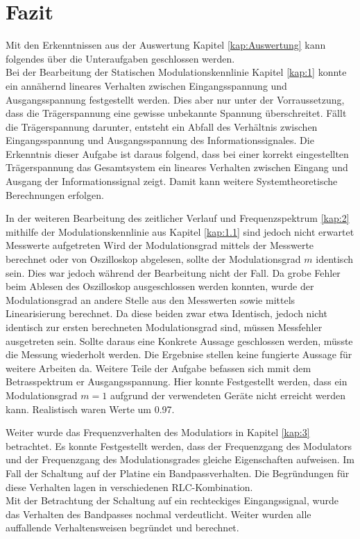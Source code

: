\documentclass[12pt]{scrartcl}
\begin{document}
\section{Fazit}
Mit den Erkenntnissen aus der Auswertung Kapitel \ref{kap:Auswertung} kann folgendes über die Unteraufgaben geschlossen werden.\\
Bei der Bearbeitung der Statischen Modulationskennlinie Kapitel \ref{kap:1} konnte ein annähernd lineares Verhalten zwischen Eingangsspannung und Ausgangsspannung festgestellt werden. 
Dies aber nur unter der Vorraussetzung, dass die Trägerspannung eine gewisse unbekannte Spannung überschreitet.
Fällt die Trägerspannung darunter, entsteht ein Abfall des Verhältnis zwischen Eingangsspannung und Ausgangsspannung des Informationssignales.
Die Erkenntnis dieser Aufgabe ist daraus folgend, dass bei einer korrekt eingestellten Trägerspannung das Gesamtsystem ein lineares Verhalten zwischen Eingang und Ausgang der Informationssignal zeigt. 
Damit kann weitere Systemtheoretische Berechnungen erfolgen.
\bigskip

In der weiteren Bearbeitung des zeitlicher Verlauf und Frequenzspektrum \ref{kap:2} mithilfe der Modulationskennlinie aus Kapitel \ref{kap:1.1} sind jedoch nicht erwartet Messwerte aufgetreten
Wird der Modulationsgrad mittels der Messwerte berechnet oder von Oszilloskop abgelesen, sollte der Modulationsgrad $m$ identisch sein. 
Dies war jedoch während der Bearbeitung nicht der Fall. 
Da grobe Fehler beim Ablesen des Oszilloskop ausgeschlossen werden konnten, wurde der Modulationsgrad an andere Stelle aus den Messwerten sowie mittels Linearisierung berechnet. 
Da diese beiden zwar etwa Identisch, jedoch nicht identisch zur ersten berechneten Modulationsgrad sind, müssen Messfehler ausgetreten sein. 
Sollte daraus eine Konkrete Aussage geschlossen werden, müsste die Messung wiederholt werden. 
Die Ergebnise stellen keine fungierte Aussage für weitere Arbeiten da.
Weitere Teile der Aufgabe befassen sich mmit dem Betrasspektrum er Ausgangsspannung. 
Hier konnte Festgestellt werden, dass ein Modulationsgrad $m=1$ aufgrund der verwendeten Geräte nicht erreicht werden kann.
Realistisch waren Werte um 0.97.
\bigskip

Weiter wurde das Frequenzverhalten des Modulatiors in Kapitel \ref{kap:3} betrachtet. 
Es konnte Festgestellt werden, dass der Frequenzgang des Modulators und der Frequenzgang des Modulationsgrades gleiche Eigenschaften aufweisen. 
Im Fall der Schaltung auf der Platine ein Bandpassverhalten.
Die Begründungen für diese Verhalten lagen in verschiedenen RLC-Kombination.\\
Mit der Betrachtung der Schaltung auf ein rechteckiges Eingangssignal, wurde das Verhalten des Bandpasses nochmal verdeutlicht. 
Weiter wurden alle auffallende Verhaltensweisen begründet und berechnet.
\bigskip
\end{document}
